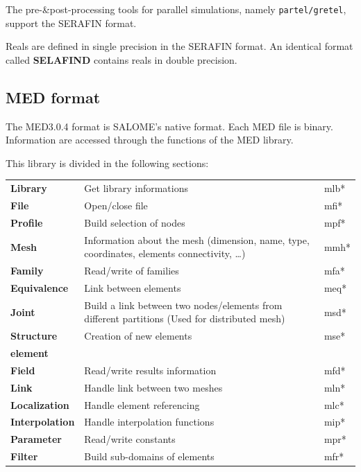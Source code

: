The pre-\&post-processing tools for parallel simulations, namely
\verb+partel/gretel+, support the SERAFIN format.

Reals are defined in single precision in the SERAFIN format. An identical format
called \textbf{SELAFIND} contains reals in double precision.

\subsection{MED format}

The MED3.0.4 format is SALOME's native format. Each MED file is binary.
Information are accessed through the functions of the MED library.

This library is divided in the following sections:

\begin{tabular}{p{70pt}@{ : }p{200pt}p{50pt}}
  \textbf{Library} & Get library informations & mlb* \\
  \textbf{File} & Open/close file & mfi* \\
  \textbf{Profile} & Build selection of nodes & mpf*\\
  \textbf{Mesh} & Information about the mesh (dimension, name, type, coordinates, elements connectivity, \ldots) & mmh*\\
  \textbf{Family} & Read/write of families & mfa*\\
  \textbf{Equivalence} & Link between elements & meq*\\
  \textbf{Joint} & Build a link between two nodes/elements from different partitions (Used for distributed mesh)& msd*\\
  \textbf{Structure} & Creation of new elements & mse*\\
  \textbf{element} & & \\
  \textbf{Field} & Read/write results information & mfd*\\
  \textbf{Link} & Handle link between two meshes & mln*\\
  \textbf{Localization} & Handle element referencing & mlc*\\
  \textbf{Interpolation} & Handle interpolation functions & mip*\\
  \textbf{Parameter} & Read/write constants & mpr*\\
  \textbf{Filter} & Build sub-domains of elements & mfr*\\
\end{tabular}

